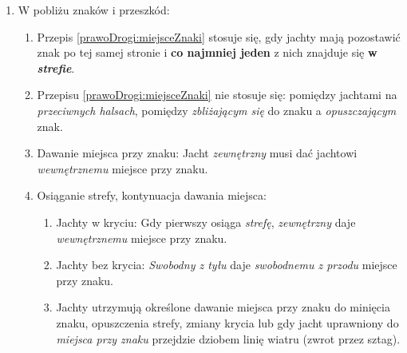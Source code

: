 \documentclass[12pt,a4paper]{article}
\begin{document}
\begin{enumerate}
\begin{enumerate}
        Gdy jacht na \textit{lewym halsie} ustępuje jachtowi na \textit{prawym halsie}, jacht na \textit{prawym halsie} nie może odpaść w sposób zmuszający jacht na \textit{lewym halsie} do zmiany kursu.
        \item Na tym samym halsie, kurs właściwy (doganianie, osiąganie krycia z zawietrznej): 
        Jacht \textit{swobodny z tyłu}, gdy osiąga \textit{krycie} po \textit{zawietrznej} jachtu będącego na \textit{tym samym halsie} w zasięgu \textbf{dwóch długości swojego kadłuba}, nie może żeglować powyżej swojego \textit{kursu właściwego}, dopóki obydwa jachty pozostają na \textit{tym samym halsie} i w \textit{kryciu} w odległości określonej powyżej, chyba że w wyniku takiego manewru \textit{zawietrzny} znajdzie się za rufą drugiego.
        Przepis nie obowiązuje, jeżeli krycie rozpoczyna się w chwili, gdy jacht nawietrzny musi ustępować na podstawie przepisu \ref{prawoDrogi:podczasZwrotuNaWiatr}.
    \end{enumerate}
    \item W pobliżu znaków i przeszkód: \label{prawoDrogi:miejsceZnaki}
    \begin{enumerate}
        \item Przepis \ref{prawoDrogi:miejsceZnaki} stosuje się, gdy jachty mają pozostawić znak po tej samej stronie i \textbf{co najmniej jeden} z nich znajduje się \textbf{w \textit{strefie}}.
        \item Przepisu \ref{prawoDrogi:miejsceZnaki} nie stosuje się: pomiędzy jachtami na \textit{przeciwnych halsach}, pomiędzy \textit{zbliżającym się} do znaku a \textit{opuszczającym} znak.
        \item Dawanie miejsca przy znaku: Jacht \textit{zewnętrzny} musi dać jachtowi \textit{wewnętrznemu} miejsce przy znaku.
        \item Osiąganie strefy, kontynuacja dawania miejsca:
        \begin{enumerate}
            \item Jachty w kryciu: Gdy pierwszy osiąga \textit{strefę}, \textit{zewnętrzny} daje \textit{wewnętrznemu} miejsce przy znaku.
            \item Jachty bez krycia: \textit{Swobodny z tyłu} daje \textit{swobodnemu z przodu} miejsce przy znaku.
            \item Jachty utrzymują określone dawanie miejsca przy znaku do minięcia znaku, opuszczenia strefy, zmiany krycia lub gdy jacht uprawniony do \textit{miejsca przy znaku} przejdzie dziobem linię wiatru (zwrot przez sztag).

\end{enumerate}
\end{enumerate}
\end{enumerate}
\end{document}
